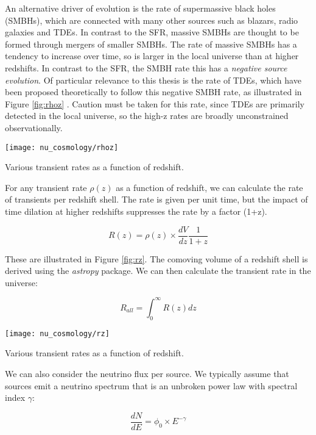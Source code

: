 An alternative driver of evolution is the rate of supermassive black holes (SMBHs), which are connected with many other sources such as blazars, radio galaxies and TDEs. In contrast to the SFR, massive SMBHs are thought to be formed through mergers of smaller SMBHs. The rate of massive SMBHs has a tendency to increase over time, so is larger in the local universe than at higher redshifts. In contrast to the SFR, the SMBH rate this has a \emph{negative source evolution}. Of particular relevance to this thesis is the rate of TDEs, which have been proposed theoretically to follow this negative SMBH rate, as illustrated in Figure \ref{fig:rhoz} . Caution must be taken for this rate, since TDEs are primarily detected in the local universe, so the high-z rates are broadly unconstrained observationally.

\begin{marginfigure}
	\centering \texttt{[image: nu\_cosmology/rhoz]}
	\caption{Various transient rates as a function of redshift.}
	\label{fig:rhoz}
\end{marginfigure}

For any transient rate $\rho (z)$ as a function of redshift, we can calculate the rate of transients per redshift shell. The rate is given per unit time, but the impact of time dilation at higher redshifts suppresses the rate by a factor (1+z). 

\begin{equation}
R(z) = \rho(z) \times \frac{dV}{dz} \frac{1}{1+z}
\end{equation}

These are illustrated in Figure \ref{fig:rz}. The comoving volume of a redshift shell is derived using the \emph{astropy} package. We can then calculate the transient rate in the universe:

\begin{equation}
R_{all} = \int_{0}^{\infty} R(z) dz
\end{equation}

\begin{marginfigure}
	\centering \texttt{[image: nu\_cosmology/rz]}
	\caption{Various transient rates as a function of redshift.}
	\label{fig:rz}
\end{marginfigure}

We can also consider the neutrino flux per source. We typically assume that sources emit a neutrino spectrum that is an unbroken power law with spectral index $\gamma$:

\begin{equation}
\frac{dN}{dE} = \phi_{0} \times E^{-\gamma}
\end{equation}

